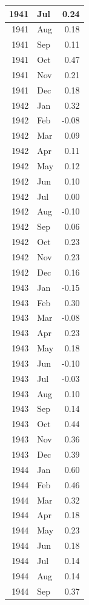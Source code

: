 \documentclass[
]{article}
\begin{document}
\begin{table}[H]
\begin{tabular}[t]{r|l|r}
\hline
1941 & Jul & 0.24\\
\hline
1941 & Aug & 0.18\\
\hline
1941 & Sep & 0.11\\
\hline
1941 & Oct & 0.47\\
\hline
1941 & Nov & 0.21\\
\hline
1941 & Dec & 0.18\\
\hline
1942 & Jan & 0.32\\
\hline
1942 & Feb & -0.08\\
\hline
1942 & Mar & 0.09\\
\hline
1942 & Apr & 0.11\\
\hline
1942 & May & 0.12\\
\hline
1942 & Jun & 0.10\\
\hline
1942 & Jul & 0.00\\
\hline
1942 & Aug & -0.10\\
\hline
1942 & Sep & 0.06\\
\hline
1942 & Oct & 0.23\\
\hline
1942 & Nov & 0.23\\
\hline
1942 & Dec & 0.16\\
\hline
1943 & Jan & -0.15\\
\hline
1943 & Feb & 0.30\\
\hline
1943 & Mar & -0.08\\
\hline
1943 & Apr & 0.23\\
\hline
1943 & May & 0.18\\
\hline
1943 & Jun & -0.10\\
\hline
1943 & Jul & -0.03\\
\hline
1943 & Aug & 0.10\\
\hline
1943 & Sep & 0.14\\
\hline
1943 & Oct & 0.44\\
\hline
1943 & Nov & 0.36\\
\hline
1943 & Dec & 0.39\\
\hline
1944 & Jan & 0.60\\
\hline
1944 & Feb & 0.46\\
\hline
1944 & Mar & 0.32\\
\hline
1944 & Apr & 0.18\\
\hline
1944 & May & 0.23\\
\hline
1944 & Jun & 0.18\\
\hline
1944 & Jul & 0.14\\
\hline
1944 & Aug & 0.14\\
\hline
1944 & Sep & 0.37\\

\end{tabular}
\end{table}
\end{document}
